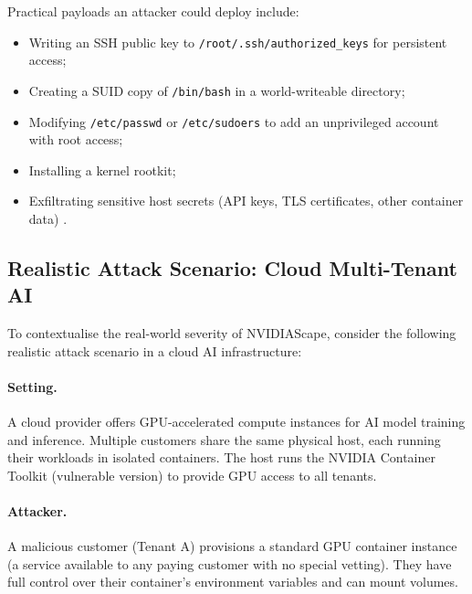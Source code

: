 Practical payloads an attacker could deploy include:
\begin{itemize}
    \item Writing an SSH public key to \texttt{/root/.ssh/authorized\_keys} for persistent access;
    \item Creating a SUID copy of \texttt{/bin/bash} in a world-writeable directory;
    \item Modifying \texttt{/etc/passwd} or \texttt{/etc/sudoers} to add an unprivileged account with root access;
    \item Installing a kernel rootkit;
    \item Exfiltrating sensitive host secrets (API keys, TLS certificates, other container data) \cite{wiz_nvidia_2024}.
\end{itemize}

\subsection{Realistic Attack Scenario: Cloud Multi-Tenant AI}
\label{subsec:scenario}

To contextualise the real-world severity of NVIDIAScape, consider the following realistic attack scenario in a cloud AI infrastructure:
 
\paragraph{Setting.} A cloud provider offers GPU-accelerated compute instances for AI model training and inference. Multiple customers share the same physical host, each running their workloads in isolated containers. The host runs the NVIDIA Container Toolkit (vulnerable version) to provide GPU access to all tenants.
 
\paragraph{Attacker.} A malicious customer (Tenant A) provisions a standard GPU container instance (a service available to any paying customer with no special vetting). They have full control over their container's environment variables and can mount volumes.
 
